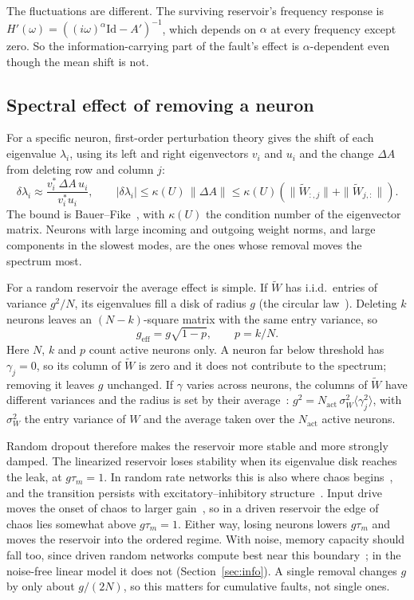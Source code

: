 \documentclass[11pt,a4paper]{article}
\newcommand{\Wt}{\tilde W}
\begin{document}
The fluctuations are different. The surviving reservoir's frequency response is $H'(\omega) = \left((i\omega)^{\alpha} \mathrm{Id} - A'\right)^{-1}$, which depends on $\alpha$ at every frequency except zero. So the information-carrying part of the fault's effect is $\alpha$-dependent even though the mean shift is not.

\subsection{Spectral effect of removing a neuron}

For a specific neuron, first-order perturbation theory gives the shift of each eigenvalue $\lambda_i$, using its left and right eigenvectors $v_i$ and $u_i$ and the change $\Delta A$ from deleting row and column $j$:
\begin{equation}
\delta\lambda_i \approx \frac{v_i^{*}\, \Delta A\, u_i}{v_i^{*} u_i}, \qquad |\delta\lambda_i| \le \kappa(U)\, \|\Delta A\| \le \kappa(U)\left( \|\Wt_{:,j}\| + \|\Wt_{j,:}\| \right).
\label{eq:bauerfike}
\end{equation}
The bound is Bauer--Fike~\cite{bauerfike1960}, with $\kappa(U)$ the condition number of the eigenvector matrix. Neurons with large incoming and outgoing weight norms, and large components in the slowest modes, are the ones whose removal moves the spectrum most.

For a random reservoir the average effect is simple. If $\Wt$ has i.i.d.\ entries of variance $g^2/N$, its eigenvalues fill a disk of radius $g$ (the circular law~\cite{taovu2010}). Deleting $k$ neurons leaves an $(N-k)$-square matrix with the same entry variance, so
\begin{equation}
g_{\mathrm{eff}} = g\sqrt{1-p}, \qquad p = k/N.
\label{eq:geff}
\end{equation}
Here $N$, $k$ and $p$ count active neurons only. A neuron far below threshold has $\gamma_j = 0$, so its column of $\Wt$ is zero and it does not contribute to the spectrum; removing it leaves $g$ unchanged. If $\gamma$ varies across neurons, the columns of $\Wt$ have different variances and the radius is set by their average~\cite{aljadeff2015}: $g^2 = N_{\mathrm{act}}\, \sigma_W^2 \langle \gamma_j^2 \rangle$, with $\sigma_W^2$ the entry variance of $W$ and the average taken over the $N_{\mathrm{act}}$ active neurons.

Random dropout therefore makes the reservoir more stable and more strongly damped. The linearized reservoir loses stability when its eigenvalue disk reaches the leak, at $g\tau_m = 1$. In random rate networks this is also where chaos begins~\cite{sompolinsky1988}, and the transition persists with excitatory--inhibitory structure~\cite{kadmon2015}. Input drive moves the onset of chaos to larger gain~\cite{rajan2010}, so in a driven reservoir the edge of chaos lies somewhat above $g\tau_m = 1$. Either way, losing neurons lowers $g\tau_m$ and moves the reservoir into the ordered regime. With noise, memory capacity should fall too, since driven random networks compute best near this boundary~\cite{bertschinger2004}; in the noise-free linear model it does not (Section~\ref{sec:info}). A single removal changes $g$ by only about $g/(2N)$, so this matters for cumulative faults, not single ones.
\end{document}
